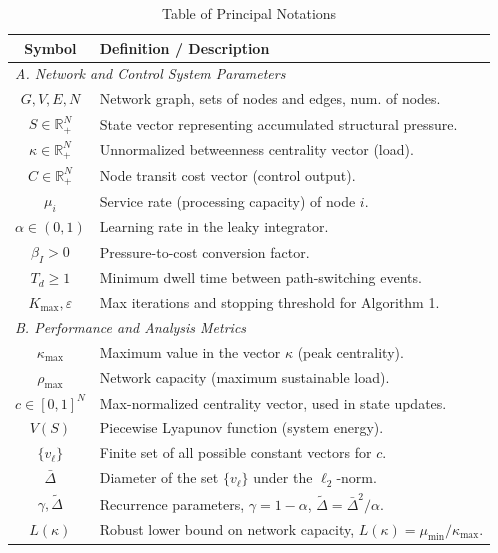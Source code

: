 \documentclass[journal]{IEEEtran}
\begin{document}
\begin{table}[t!]
\centering
\caption{Table of Principal Notations}
\label{tab:notations}
\renewcommand{\arraystretch}{1.2} %
\begin{tabular}{c l}
\hline
\hline
\textbf{Symbol} & \textbf{Definition / Description} \\
\hline
\multicolumn{2}{l}{\textit{A. Network and Control System Parameters}} \\
$G, V, E, N$ & Network graph, sets of nodes and edges, num. of nodes. \\
$S \in \mathbb{R}^N_+$ & State vector representing accumulated structural pressure. \\
$\kappa \in \mathbb{R}^N_+$ & Unnormalized betweenness centrality vector (load). \\
$C \in \mathbb{R}^N_+$ & Node transit cost vector (control output). \\
$\mu_i$ & Service rate (processing capacity) of node $i$. \\
$\alpha \in (0,1)$ & Learning rate in the leaky integrator. \\
$\beta_I > 0$ & Pressure-to-cost conversion factor. \\
$T_d \ge 1$ & Minimum dwell time between path-switching events. \\
$K_{\max}, \varepsilon$ & Max iterations and stopping threshold for Algorithm 1. \\
\hline
\multicolumn{2}{l}{\textit{B. Performance and Analysis Metrics}} \\
$\kappa_{\max}$ & Maximum value in the vector $\kappa$ (peak centrality). \\
$\rho_{\max}$ & Network capacity (maximum sustainable load). \\
$c \in [0,1]^N$ & Max-normalized centrality vector, used in state updates. \\
$V(S)$ & Piecewise Lyapunov function (system energy). \\
$\{v_\ell\}$ & Finite set of all possible constant vectors for $c$. \\
$\bar\Delta$ & Diameter of the set $\{v_\ell\}$ under the $\ell_2$-norm. \\
$\gamma, \tilde\Delta$ & Recurrence parameters, $\gamma=1-\alpha$, $\tilde\Delta=\bar\Delta^2/\alpha$. \\
$L(\kappa)$ & Robust lower bound on network capacity, $L(\kappa)=\mu_{\min}/\kappa_{\max}$. \\
\hline
\hline
\end{tabular}
\end{table}
\end{document}
